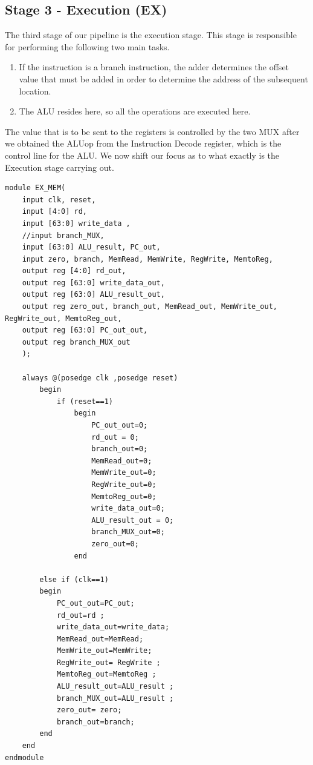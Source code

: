 \documentclass{article}
\begin{document}
\subsection{Stage 3 - Execution (EX)}
The third stage of our pipeline is the execution stage. This stage is responsible for performing the following two main tasks. 

\begin{enumerate}
    \item If the instruction is a branch instruction, the adder determines the offset value that must be added in order to determine the address of the subsequent location.
    \item The ALU resides here, so all the operations are executed here.
\end{enumerate}

The value that is to be sent to the registers is controlled by the two MUX after we obtained the ALUop from the Instruction Decode register, which is the control line for the ALU. We now shift our focus as to what exactly is the Execution stage carrying out. 

\begin{lstlisting}[caption={EX/MEM Register}, captionpos=b, language=RISC-V]
module EX_MEM(
    input clk, reset,
    input [4:0] rd,
    input [63:0] write_data , 
    //input branch_MUX,
    input [63:0] ALU_result, PC_out,
    input zero, branch, MemRead, MemWrite, RegWrite, MemtoReg, 
    output reg [4:0] rd_out,
    output reg [63:0] write_data_out, 
    output reg [63:0] ALU_result_out, 
    output reg zero_out, branch_out, MemRead_out, MemWrite_out, RegWrite_out, MemtoReg_out, 
    output reg [63:0] PC_out_out,
    output reg branch_MUX_out
    );

    always @(posedge clk ,posedge reset)
        begin
            if (reset==1)
                begin
                    PC_out_out=0;
                    rd_out = 0;
                    branch_out=0;
                    MemRead_out=0;
                    MemWrite_out=0;
                    RegWrite_out=0;
                    MemtoReg_out=0;
                    write_data_out=0; 
                    ALU_result_out = 0;
                    branch_MUX_out=0;
                    zero_out=0;
                end

        else if (clk==1)
        begin
            PC_out_out=PC_out;
            rd_out=rd ;
            write_data_out=write_data; 
            MemRead_out=MemRead;
            MemWrite_out=MemWrite;
            RegWrite_out= RegWrite ;
            MemtoReg_out=MemtoReg ;
            ALU_result_out=ALU_result ;
            branch_MUX_out=ALU_result ;
            zero_out= zero;
            branch_out=branch;  
        end
    end
endmodule

\end{lstlisting}
\end{document}
